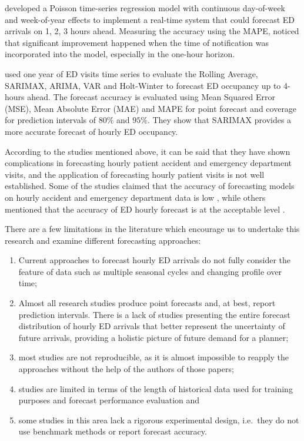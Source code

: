 \documentclass[]{elsarticle} %
\providecommand{\tightlist}{%
  \setlength{\itemsep}{0pt}\setlength{\parskip}{0pt}}
\begin{document}
\citet{asheim2019real} developed a Poisson time-series regression model with continuous day-of-week and week-of-year effects to implement a real-time system that could forecast ED arrivals on 1, 2, 3 hours ahead. Measuring the accuracy using the MAPE, \citet{asheim2019real} noticed that significant improvement happened when the time of notification was incorporated into the model, especially in the one-hour horizon.

\citet{cheng2021forecasting} used one year of ED visits time series to evaluate the Rolling Average, SARIMAX, ARIMA, VAR and Holt-Winter to forecast ED occupancy up to 4-hours ahead. The forecast accuracy is evaluated using Mean Squared Error (MSE), Mean Absolute Error (MAE) and MAPE for point forecast and coverage for prediction intervals of \(80\%\) and \(95\%\). They show that SARIMAX provides a more accurate forecast of hourly ED occupancy.

According to the studies mentioned above, it can be said that they have shown complications in forecasting hourly patient accident and emergency department visits, and the application of forecasting hourly patient visits is not well established. Some of the studies claimed that the accuracy of forecasting models on hourly accident and emergency department data is low \citep{boyle2012predicting, hertzum2017forecasting}, while others mentioned that the accuracy of ED hourly forecast is at the acceptable level \citep{choudhury2020forecasting, mccarthy2008challenge, schweigler2009forecasting}.

There are a few limitations in the literature which encourage us to undertake this research and examine different forecasting approaches:

\begin{enumerate}
\def\labelenumi{(\roman{enumi})}
\tightlist
\item
  Current approaches to forecast hourly ED arrivals do not fully consider the feature of data such as multiple seasonal cycles and changing profile over time;
\item
  Almost all research studies produce point forecasts and, at best, report prediction intervals. There is a lack of studies presenting the entire forecast distribution of hourly ED arrivals that better represent the uncertainty of future arrivals, providing a holistic picture of future demand for a planner;
\item
  most studies are not reproducible, as it is almost impossible to reapply the approaches without the help of the authors of those papers;
\item
  studies are limited in terms of the length of historical data used for training purposes and forecast performance evaluation and
\item
  some studies in this area lack a rigorous experimental design, i.e.~they do not use benchmark methods or report forecast accuracy.
\end{enumerate}
\end{document}
